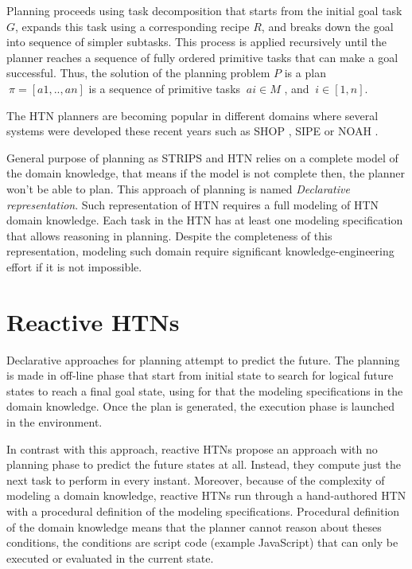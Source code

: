 \par Planning proceeds using task decomposition that starts from the initial goal task $G$, expands this task using a corresponding recipe $R$, and breaks down the goal into sequence of simpler subtasks. This process is applied recursively until the planner reaches a sequence of fully ordered primitive tasks that can make a goal successful. Thus, the solution of the planning problem $P$ is a plan $\ \pi = [a1,.., an]$ is a sequence of primitive tasks $\ ai \in M$ , and $\ i \in [1,n].$

\par The HTN planners are becoming popular in different domains where several systems were developed these recent years such as SHOP \cite{nau1999shop}, SIPE \cite{wilkins1988practical} or NOAH \cite{sacerdoti1975structure}.

\par General purpose of planning as STRIPS and HTN relies on a complete model of the domain knowledge, that means if the model is not complete then, the planner won't be able to plan. This approach of planning is named \emph{Declarative representation}. Such representation of HTN requires a full modeling of HTN domain knowledge. Each
task in the HTN has at least one modeling specification that allows reasoning in planning. Despite the completeness of this representation, modeling such domain require significant knowledge-engineering effort if it is not impossible.

\section{Reactive HTNs}
Declarative approaches for planning attempt to predict the future. The planning is made in off-line phase that start from initial state to search for logical future states to reach a final goal state, using for that the modeling specifications in the domain knowledge. Once the plan is generated, the execution phase is launched in the environment.
\par In contrast with this approach, reactive HTNs propose an approach with no planning phase to predict the future states at all. Instead, they compute just the next task to perform in every instant. Moreover, because of the complexity of modeling a domain knowledge, reactive HTNs run through a hand-authored HTN with a procedural definition of the modeling specifications. Procedural definition of the domain knowledge means that the planner cannot reason about theses conditions, the conditions are script code (example JavaScript)  that can only be executed or evaluated in the current state.

